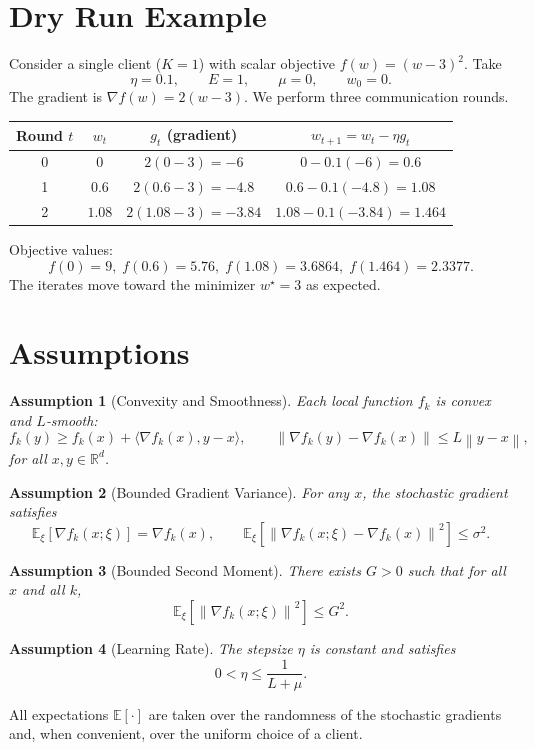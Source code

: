 \documentclass[11pt]{article}
\newtheorem{assumption}{Assumption}
\newcommand{\E}{\mathbb{E}}
\newcommand{\R}{\mathbb{R}}
\newcommand{\norm}[1]{\left\|#1\right\|}
\newcommand{\inner}[2]{\langle #1,#2\rangle}
\begin{document}
\section*{Dry Run Example}
Consider a single client ($K=1$) with scalar objective $f(w)=(w-3)^2$.  Take
\[
    \eta=0.1,\qquad E=1,\qquad \mu=0,\qquad w_0=0.
\]
The gradient is $\nabla f(w)=2(w-3)$.  We perform three communication rounds.

\begin{center}
\begin{tabular}{c|c|c|c}
\textbf{Round $t$} & $w_t$ & $g_t$ (gradient) & $w_{t+1}=w_t-\eta g_t$ \\ \hline
0 & $0$ & $2(0-3)=-6$ & $0-0.1(-6)=0.6$ \\
1 & $0.6$ & $2(0.6-3)=-4.8$ & $0.6-0.1(-4.8)=1.08$ \\
2 & $1.08$ & $2(1.08-3)=-3.84$ & $1.08-0.1(-3.84)=1.464$ \\
\end{tabular}
\end{center}
Objective values:
\[
    f(0)=9,\; f(0.6)=5.76,\; f(1.08)=3.6864,\; f(1.464)=2.3377.
\]
The iterates move toward the minimizer $w^{\star}=3$ as expected.

\newpage
\section*{Assumptions}
\begin{assumption}[Convexity and Smoothness]\label{asm:convex}
Each local function $f_k$ is convex and $L$‑smooth:
\[
    f_k(y)\ge f_k(x)+\inner{\nabla f_k(x)}{y-x},\qquad
    \norm{\nabla f_k(y)-\nabla f_k(x)}\le L\norm{y-x},
\]
for all $x,y\in\R^d$.
\end{assumption}
\begin{assumption}[Bounded Gradient Variance]\label{asm:variance}
For any $x$, the stochastic gradient satisfies
\[
    \E_{\xi}\!\left[\nabla f_k(x;\xi)\right]=\nabla f_k(x),\qquad
    \E_{\xi}\!\left[\norm{\nabla f_k(x;\xi)-\nabla f_k(x)}^{2}\right]\le \sigma^{2}.
\]
\end{assumption}
\begin{assumption}[Bounded Second Moment]\label{asm:bounded}
There exists $G>0$ such that for all $x$ and all $k$,
\[
    \E_{\xi}\!\left[\norm{\nabla f_k(x;\xi)}^{2}\right]\le G^{2}.
\]
\end{assumption}
\begin{assumption}[Learning Rate]\label{asm:eta}
The stepsize $\eta$ is constant and satisfies
\[
    0<\eta\le \frac{1}{L+\mu}.
\]
\end{assumption}
All expectations $\E[\cdot]$ are taken over the randomness of the stochastic gradients and, when convenient, over the uniform choice of a client.
\end{document}
